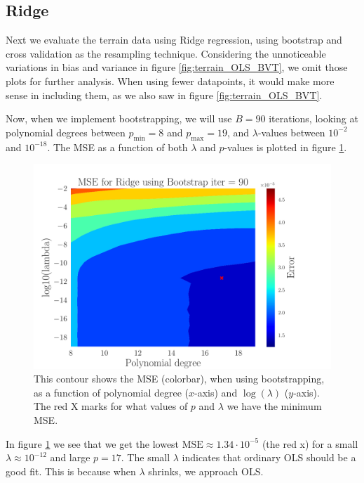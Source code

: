 \documentclass[reprint,english,notitlepage,aps,nobalancelastpage,nofootinbib]{revtex4-1}  %
\begin{document}
\subsection*{Ridge}
Next we evaluate the terrain data using Ridge regression, using bootstrap and cross validation as the resampling technique. Considering the unnoticeable variations in bias and variance in figure \ref{fig:terrain_OLS_BVT}, we omit those plots for further analysis. When using fewer datapoints, it would make more sense in including them, as we also saw in figure \ref{fig:terrain_OLS_BVT}.

Now, when we implement bootstrapping, we will use $B=90$ iterations, looking at polynomial degrees between $p_\text{min} = 8$ and $p_\text{max} = 19$, and $\lambda$-values between $10^{-2}$ and $10^{-18}$. The MSE as a function of both $\lambda$ and $p$-values is plotted in figure \ref{fig:terrain_Ridge_MSE_Boot}.
\begin{figure}[h]
	\includegraphics[width=0.8\linewidth]{SRTM_Contour_PL_Ridge_Bootstrap90_n50_eps0.2_p8_19_lmbm2_m19.pdf}
	\caption{This contour shows the MSE (colorbar), when using bootstrapping, as a function of polynomial degree ($x$-axis) and $\log(\lambda)$ ($y$-axis). The red X marks for what values of $p$ and $\lambda$ we have the minimum MSE.}
	\label{fig:terrain_Ridge_MSE_Boot}
\end{figure}
In figure \ref{fig:terrain_Ridge_MSE_Boot} we see that we get the lowest $\text{MSE} \approx 1.34\cdot10^{-5}$ (the red x) for a small $\lambda \approx 10^{-12}$ and large $p = 17$. The small $\lambda$ indicates that ordinary OLS should be a good fit. This is because when $\lambda$ shrinks, we approach OLS.
\end{document}
